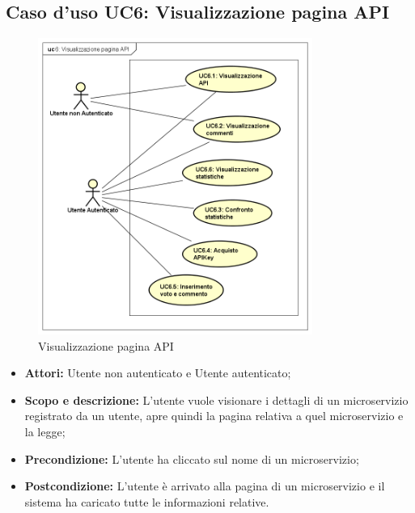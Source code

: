 \documentclass[12pt,a4paper,titlepage]{article}
\begin{document}
	\subsection{Caso d'uso UC6: Visualizzazione pagina API}
	\label{UC6}
	\begin{figure}[H]
		\centering
		\includegraphics[width=0.8\textwidth]{UseCase/VisualizzazionePaginaAPI}
		\caption{Visualizzazione pagina API}
	\end{figure}
	\begin{itemize}
		\item \textbf{Attori: }Utente non autenticato e Utente autenticato;
		\item \textbf{Scopo e descrizione: }L'utente vuole visionare i dettagli di un microservizio registrato da un utente, apre quindi la pagina relativa a quel microservizio e la legge;
		\item \textbf{Precondizione: }L'utente ha cliccato sul nome di un microservizio;
		\item \textbf{Postcondizione: }L'utente è arrivato alla pagina di un microservizio e il sistema ha caricato tutte le informazioni relative.
	\end{itemize}
\end{document}
